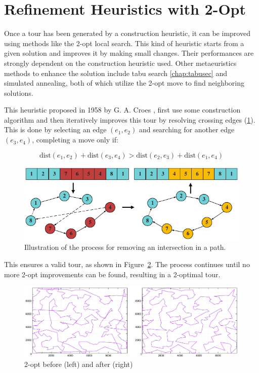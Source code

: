\section{Refinement Heuristics with 2-Opt}
Once a tour has been generated by a construction heuristic, it can be improved using methods like the 2-opt local search. This kind of heuristic starts from a given solution and improves it by making small changes. Their performances are strongly dependent on the construction heuristic used. Other metaeuristics methods to enhance the solution include tabu search \ref{chap:tabusec} and simulated annealing, both of which utilize the 2-opt move to find neighboring solutions.

This heuristic proposed in 1958 by G. A. Croes \cite{2opt}, first use some construction algorithm and then iteratively improves this tour by resolving crossing edges (\ref{fig:crossing_edge}). This is done by selecting an edge \((e_1, e_2)\) and searching for another edge \((e_3, e_4)\), completing a move only if:

\[ \text{dist}(e_1, e_2) + \text{dist}(e_3, e_4) > \text{dist}(e_2, e_3) + \text{dist}(e_1, e_4) \]

\begin{figure}[H]
    \centering
    \includegraphics[width=0.9\linewidth]{Immagini/Crossing edges.pdf}
    \caption{Illustration of the process for removing an intersection in a path.}
    \label{fig:crossing_edge}
\end{figure}

This ensures a valid tour, as shown in Figure~\ref{fig:2opt_before_after}. The process continues until no more 2-opt improvements can be found, resulting in a 2-optimal tour. \\

\begin{figure}[H]
    \centering
    \includegraphics[width=\linewidth]{Immagini/NN+2opt.pdf}
    \caption{2-opt before (left) and after (right)}
    \label{fig:2opt_before_after}
\end{figure}


